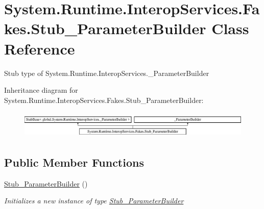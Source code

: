\hypertarget{class_system_1_1_runtime_1_1_interop_services_1_1_fakes_1_1_stub___parameter_builder}{\section{System.\-Runtime.\-Interop\-Services.\-Fakes.\-Stub\-\_\-\-Parameter\-Builder Class Reference}
\label{class_system_1_1_runtime_1_1_interop_services_1_1_fakes_1_1_stub___parameter_builder}
}


Stub type of System.\-Runtime.\-Interop\-Services.\-\_\-\-Parameter\-Builder 


Inheritance diagram for System.\-Runtime.\-Interop\-Services.\-Fakes.\-Stub\-\_\-\-Parameter\-Builder\-:\begin{figure}[H]
\begin{center}
\leavevmode
\includegraphics[height=1.317647cm]{class_system_1_1_runtime_1_1_interop_services_1_1_fakes_1_1_stub___parameter_builder}
\end{center}
\end{figure}
\subsection*{Public Member Functions}
\begin{DoxyCompactItemize}
\item 
\hyperlink{class_system_1_1_runtime_1_1_interop_services_1_1_fakes_1_1_stub___parameter_builder_a391c97c3a437979ebed1bf0e898401f8}{Stub\-\_\-\-Parameter\-Builder} ()
\begin{DoxyCompactList}\small\item\em Initializes a new instance of type \hyperlink{class_system_1_1_runtime_1_1_interop_services_1_1_fakes_1_1_stub___parameter_builder}{Stub\-\_\-\-Parameter\-Builder}\end{DoxyCompactList}\end{DoxyCompactItemize}
